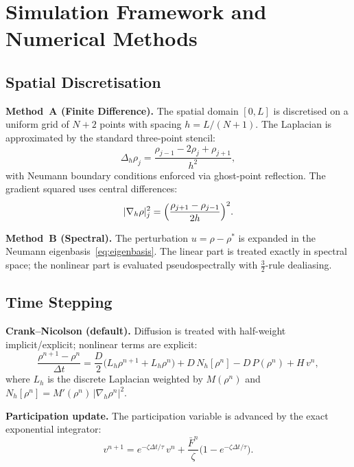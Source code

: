 \documentclass[11pt,twoside,openright]{book}
\theoremstyle{definition}
\theoremstyle{plain}
\theoremstyle{definition}
\theoremstyle{remark}
\newcommand{\rhostar}{\rho^{*}}
\begin{document}
\chapter{Simulation Framework and Numerical Methods}\label{ch:numerics}

\section{Spatial Discretisation}\label{sec:spatial}

\textbf{Method~A (Finite Difference).} The spatial domain \([0,L]\) is discretised on a uniform grid of \(N+2\) points with spacing \(h = L/(N+1)\). The Laplacian is approximated by the standard three-point stencil:
\begin{equation}\label{eq:laplacian}
\Delta_h\rho_j = \frac{\rho_{j-1} - 2\rho_j + \rho_{j+1}}{h^2},
\end{equation}
with Neumann boundary conditions enforced via ghost-point reflection. The gradient squared uses central differences:
\begin{equation}\label{eq:grad-sq}
|\nabla_h\rho|^2_j = \Bigl(\frac{\rho_{j+1} - \rho_{j-1}}{2h}\Bigr)^2.
\end{equation}

\textbf{Method~B (Spectral).} The perturbation \(u = \rho - \rhostar\) is expanded in the Neumann eigenbasis~\eqref{eq:eigenbasis}. The linear part is treated exactly in spectral space; the nonlinear part is evaluated pseudospectrally with \(\tfrac{3}{2}\)-rule dealiasing.

\section{Time Stepping}\label{sec:time-stepping}

\textbf{Crank--Nicolson (default).} Diffusion is treated with half-weight implicit/explicit; nonlinear terms are explicit:
\begin{equation}\label{eq:CN}
\frac{\rho^{n+1} - \rho^n}{\Delta t} = \frac{D}{2}\bigl(L_h\rho^{n+1} + L_h\rho^n\bigr) + D\,N_h[\rho^n] - D\,P(\rho^n) + H\,v^n,
\end{equation}
where \(L_h\) is the discrete Laplacian weighted by \(M(\rho^n)\) and \(N_h[\rho^n] = M'(\rho^n)\,|\nabla_h\rho^n|^2\).

\textbf{Participation update.} The participation variable is advanced by the exact exponential integrator:
\begin{equation}\label{eq:participation-update}
v^{n+1} = e^{-\zeta\Delta t/\tau}\,v^n + \frac{\bar{F}^n}{\zeta}\bigl(1 - e^{-\zeta\Delta t/\tau}\bigr).
\end{equation}
\end{document}
